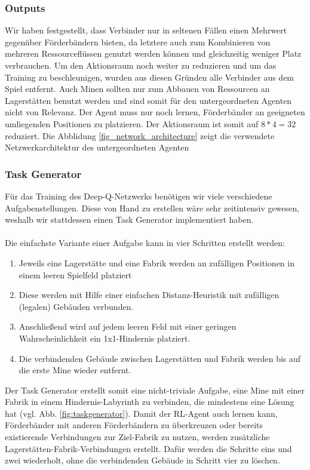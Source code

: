 \subsubsection{Outputs}
Wir haben festgestellt, dass Verbinder nur in seltenen Fällen einen Mehrwert gegenüber Förderbändern bieten, da letztere auch zum Kombinieren von mehreren Ressourceflüssen genutzt werden können und gleichzeitig weniger Platz verbrauchen. 
Um den Aktionsraum noch weiter zu reduzieren und um das Training zu beschleunigen, wurden aus diesen Gründen alle Verbinder aus dem Spiel entfernt. Auch Minen sollten nur zum Abbauen von Ressourcen an Lagerstätten benutzt werden und sind somit für den untergeordneten Agenten nicht von Relevanz. Der Agent muss nur noch lernen, Förderbänder an geeigneten umliegenden Positionen zu platzieren. Der Aktionsraum ist somit auf $8 * 4 = 32$ reduziert. Die Abblidung \ref{fig_network_architecture} zeigt die verwendete Netzwerkarchitektur des untergeordneten Agenten

\subsubsection{Task Generator}
Für das Training des Deep-Q-Netzwerks  benötigen wir viele verschiedene Aufgabenstellungen. Diese von Hand zu erstellen wäre sehr zeitintensiv gewesen, weshalb wir stattdessen einen Task Generator implementiert haben.
\\\\
Die einfachste Variante einer Aufgabe kann in vier Schritten erstellt werden:
\begin{enumerate}
	\item Jeweils eine Lagerstätte und eine Fabrik werden an zufälligen Positionen in einem leeren Spielfeld platziert
	\item Diese werden mit Hilfe einer einfachen Distanz-Heuristik mit zufälligen (legalen) Gebäuden verbunden. 
	\item Anschließend wird auf jedem leeren Feld mit einer geringen Wahrscheinlichkeit ein 1x1-Hindernis platziert. 
	\item Die verbindenden Gebäude zwischen Lagerstätten und Fabrik werden bis auf die erste Mine wieder entfernt. 
\end{enumerate}

Der Task Generator erstellt somit eine nicht-triviale Aufgabe, eine Mine mit einer Fabrik in einem Hindernis-Labyrinth zu verbinden, die mindestens eine Lösung hat (vgl. Abb. \ref{fig:taskgenerator}).
Damit der RL-Agent auch lernen kann, Förderbänder mit anderen Förderbändern zu überkreuzen oder bereits existierende Verbindungen zur Ziel-Fabrik zu nutzen, werden zusätzliche Lagerstätten-Fabrik-Verbindungen erstellt. Dafür werden die Schritte eins und zwei wiederholt, ohne die verbindenden Gebäude in Schritt vier zu löschen.

